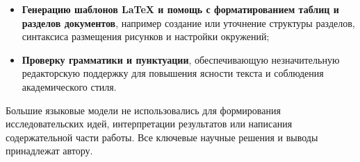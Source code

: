 \documentclass[PMI,VKR]{HSEUniversity}
\begin{document}
\begin{itemize}
    \item \textbf{Генерацию шаблонов LaTeX и помощь с форматированием таблиц и разделов документов}, например создание или уточнение структуры разделов, синтаксиса размещения рисунков и настройки окружений;

    \item \textbf{Проверку грамматики и пунктуации}, обеспечивающую незначительную редакторскую поддержку для повышения ясности текста и соблюдения академического стиля.
\end{itemize}

Большие языковые модели не использовались для формирования исследовательских идей, интерпретации результатов или написания содержательной части работы. Все ключевые научные решения и выводы принадлежат автору.
\end{document}
